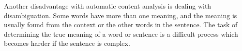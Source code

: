 Another disadvantage with automatic content analysis is dealing with disambiguation. Some words have more than one meaning, and the meaning is usually found from the context or the other words in the sentence. The task of determining the true meaning of a word or sentence is a difficult process which becomes harder if the sentence is complex. 






